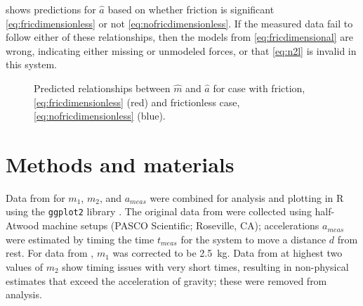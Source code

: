 \documentclass[reprint,amsmath,amssymb,aps,twoside]{revtex4-2}
\begin{document}
 shows predictions for $\hat{a}$ based on whether friction is significant \cref{eq:fricdimensionless} or not \cref{eq:nofricdimensionless}. If the measured data fail to follow either of these relationships, then the models from \cref{eq:fricdimensional} are wrong, indicating either missing or unmodeled forces, or that \cref{eq:n2l} is invalid in this system. 
\begin{figure}
\begin{center}
\end{center}
\caption{\label{fig:prediction} Predicted relationships between $\hat{m}$ and $\hat{a}$ for case with friction, \cref{eq:fricdimensionless} (red)  and frictionless case, \cref{eq:nofricdimensionless} (blue).}
\end{figure}






\section{Methods and materials}
Data from \cite{arenas-2024-testing,avalur-2024-verifying,canada-2024-experimental,kishore-2024-relationship,yagnyeshwaran-2024-verifying,govardhanen-2024-newtons,kedharnath-2024-examining,krasnopolsky-2024-testing,perle-2024-experimental} for $m_1$, $m_2$, and $a_{meas}$ were combined for analysis and plotting in R \cite{R-2024} using the \texttt{ggplot2} library \cite{ggplot2-2024}. The original data from \cite{arenas-2024-testing,avalur-2024-verifying,canada-2024-experimental,kishore-2024-relationship,yagnyeshwaran-2024-verifying,govardhanen-2024-newtons,kedharnath-2024-examining,krasnopolsky-2024-testing,perle-2024-experimental} were collected using half-Atwood machine setups (PASCO Scientific; Roseville, CA); accelerations $a_{meas}$ were estimated by timing the time $t_{meas}$ for the system to move a distance $d$ from rest. For data from \cite{govardhanen-2024-newtons}, $m_1$ was corrected to be \qty{2.5}{\kilo\gram}. Data from \cite{krasnopolsky-2024-testing} at highest two values of $m_2$ show timing issues with very short times, resulting in non-physical estimates that exceed the acceleration of gravity; these were removed from analysis.
\end{document}
